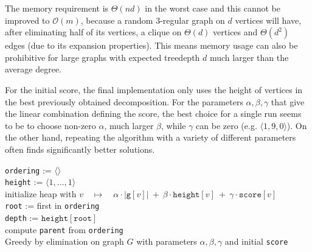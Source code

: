 \documentclass{timgad}
\newcommand{\Oh}{\ensuremath{\mathcal{O}}}
\begin{document}
The memory requirement is $\Theta(nd)$ in the worst case and this cannot be improved to $\Oh(m)$, because a random $3$-regular graph on $d$ vertices will have, after eliminating half of its vertices, a clique on $\Theta(d)$ vertices and $\Theta(d^2)$ edges (due to its expansion properties).
This means memory usage can also be prohibitive for large graphs with expected treedepth $d$ much larger than the average degree.

For the initial score, the final implementation only uses the height of vertices in the best previously obtained decomposition.
For the parameters $\alpha,\beta,\gamma$ that give the linear combination defining the score,
the best choice for a single run seems to be to choose non-zero $\alpha$, much larger $\beta$, while $\gamma$ can be zero (e.g. $\langle1,9,0\rangle$).
On the other hand, repeating the algorithm with a variety of different parameters often finds significantly better solutions.

\begin{algorithm}[h]
 \texttt{ordering} := $\langle\rangle$\\
 \texttt{height} := $\langle 1,\dots,1\rangle$\\ 
 initialize heap with $v \quad \mapsto \quad \alpha \cdot |\texttt{g}[v]|\ +\ \beta \cdot \texttt{height}[v]\ +\ \gamma \cdot \texttt{score}[v]$\\
 \texttt{root} := first in \texttt{ordering}\\ 
 \texttt{depth} := $\texttt{height}[\texttt{root}]$\\
 compute \texttt{parent} from \texttt{ordering}\\ 
 \caption{Greedy by elimination on graph $G$ with parameters $\alpha,\beta,\gamma$ and initial \texttt{score}\hspace*{-2em}}
 \label{alg:elim}
\end{algorithm}
\end{document}
